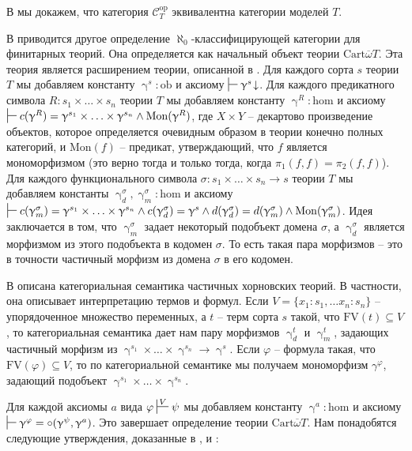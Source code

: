 \documentclass[reqno]{amsart}
\theoremstyle{definition}
\theoremstyle{remark}
\newcommand{\cat}[1]{\mathcal{#1}}
\newcommand{\fs}[1]{\mathrm{#1}}
\newcommand{\FV}{\fs{FV}}
\begin{document}
\begin{remark}
В  мы докажем, что категория $\cat{C}_T^\fs{op}$ эквивалентна категории моделей $T$.
\end{remark}

В \cite{PHL} приводится другое определение $\aleph_0$-классифицирующей категории для финитарных теорий.
Она определяется как начальный объект теории $\mathrm{Cart} \overline{\omega} T$.
Эта теория является расширением теории, описанной в .
Для каждого сорта $s$ теории $T$ мы добавляем константу $\upgamma^s : \fs{ob}$ и аксиому $\sststile{}{} \upgamma^s\!\downarrow$.
Для каждого предикатного символа $R : s_1 \times \ldots \times s_n$ теории $T$ мы добавляем константу $\upgamma^R : \fs{hom}$
и аксиому $\sststile{}{} c(\upgamma^R) = \upgamma^{s_1} \times \ldots \times \upgamma^{s_n} \land \fs{Mon}(\upgamma^R)$,
где $X \times Y$ -- декартово произведение объектов, которое определяется очевидным образом в теории конечно полных категорий, и $\fs{Mon}(f)$ -- предикат,
утверждающий, что $f$ является мономорфизмом (это верно тогда и только тогда, когда $\pi_1(f,f) = \pi_2(f,f)$).
Для каждого функционального символа $\sigma : s_1 \times \ldots \times s_n \to s$ теории $T$ мы добавляем константы $\upgamma^\sigma_d, \upgamma^\sigma_m : \fs{hom}$ и аксиому
$\sststile{}{} c(\upgamma^\sigma_m) = \upgamma^{s_1} \times \ldots \times \upgamma^{s_n} \land c(\upgamma^\sigma_d) = \upgamma^s \land d(\upgamma^\sigma_d) = d(\upgamma^\sigma_m) \land \fs{Mon}(\upgamma^\sigma_m)$.
Идея заключается в том, что $\upgamma^\sigma_m$ задает некоторый подобъект домена $\sigma$, а $\upgamma^\sigma_d$ является морфизмом из этого подобъекта в кодомен $\sigma$.
То есть такая пара морфизмов -- это в точности частичный морфизм из домена $\sigma$ в его кодомен.

В \cite[Section~8]{PHL} описана категориальная семантика частичных хорновских теорий.
В частности, она описывает интерпретацию термов и формул.
Если $V = \{ x_1 : s_1, \ldots x_n : s_n \}$ -- упорядоченное множество переменных, а $t$ -- терм сорта $s$ такой, что $\FV(t) \subseteq V$,
то категориальная семантика дает нам пару морфизмов $\upgamma^t_d$ и $\upgamma^t_m$, задающих частичный морфизм из $\upgamma^{s_1} \times \ldots \times \upgamma^{s_n} \to \upgamma^s$.
Если $\varphi$ -- формула такая, что $\FV(\varphi) \subseteq V$, то по категориальной семантике мы получаем мономорфизм $\gamma^\varphi$, задающий подобъект $\upgamma^{s_1} \times \ldots \times \upgamma^{s_n}$.

Для каждой аксиомы $a$ вида $\varphi \sststile{}{V} \psi$ мы добавляем константу $\upgamma^a : \fs{hom}$ и аксиому $\sststile{}{} \upgamma^\varphi = \circ(\upgamma^\psi,\upgamma^a)$.
Это завершает определение теории $\mathrm{Cart} \overline{\omega} T$.
Нам понадобятся следующие утверждения, доказанные в \cite[Lemma~39]{PHL}, \cite[Lemma~40]{PHL} и \cite[Theorem~41]{PHL}:
\end{document}
